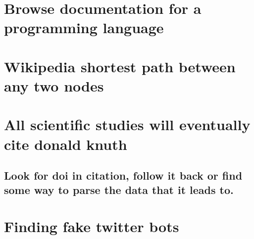 \documentclass[11pt]{article}
\begin{document}
\section{Browse documentation for a programming language}
\label{sec:org125a696}
\section{Wikipedia shortest path between any two nodes}
\label{sec:org8abb0cb}
\section{All scientific studies will eventually cite donald knuth}
\label{sec:orgb5e13da}
\subsection{Look for doi in citation, follow it back or find some way to parse the data that it leads to.}
\label{sec:orgb6f4ee2}
\section{Finding fake twitter bots}
\label{sec:org598cd9b}
\end{document}
